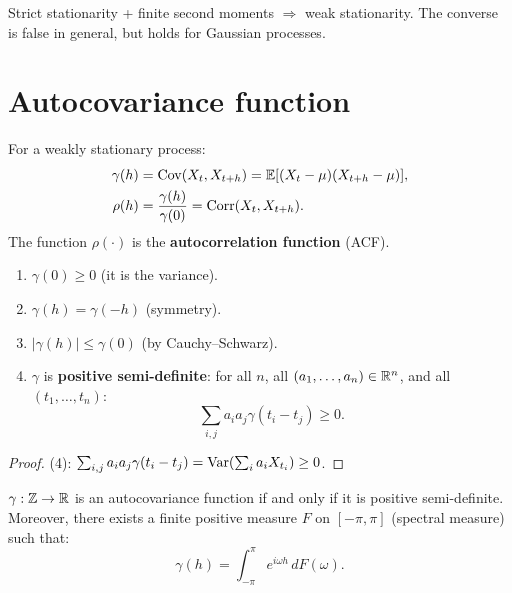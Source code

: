 \begin{remark}
Strict stationarity + finite second moments $\Rightarrow$ weak stationarity. The converse is false in general, but holds for Gaussian processes.
\end{remark}

\section{Autocovariance function}

\begin{definition}
For a weakly stationary process:
\begin{align}
\gamma(h) &= \operatorname{Cov}(X_t,X_{t+h}) = \mathbb{E}[(X_t-\mu)(X_{t+h}-\mu)], \\
\rho(h) &= \frac{\gamma(h)}{\gamma(0)} = \operatorname{Corr}(X_t,X_{t+h}).
\end{align}
The function $\rho(\cdot)$ is the \textbf{autocorrelation function} (ACF).
\end{definition}

\begin{theorem}\label{thm:gamma-prop}
\begin{enumerate}
\item $\gamma(0)\geq 0$ (it is the variance).
\item $\gamma(h)=\gamma(-h)$ (symmetry).
\item $|\gamma(h)|\leq\gamma(0)$ (by Cauchy--Schwarz).
\item $\gamma$ is \textbf{positive semi-definite}: for all $n$, all $(a_1,\ldots,a_n)\in\mathbb{R}^n$, and all $(t_1,\ldots,t_n)$:
\[
\sum_{i,j}a_i a_j\gamma(t_i-t_j)\geq 0.
\]
\end{enumerate}
\end{theorem}

\begin{proof}
(4): $\sum_{i,j}a_ia_j\gamma(t_i-t_j)=\operatorname{Var}\!\left(\sum_i a_i X_{t_i}\right)\geq 0$.
\end{proof}

\begin{theorem}[Herglotz]
$\gamma:\mathbb{Z}\to\mathbb{R}$ is an autocovariance function if and only if it is positive semi-definite. Moreover, there exists a finite positive measure $F$ on $[-\pi,\pi]$ (spectral measure) such that:
\[
\gamma(h) = \int_{-\pi}^{\pi} e^{i\omega h}\,dF(\omega).
\]
\end{theorem}

